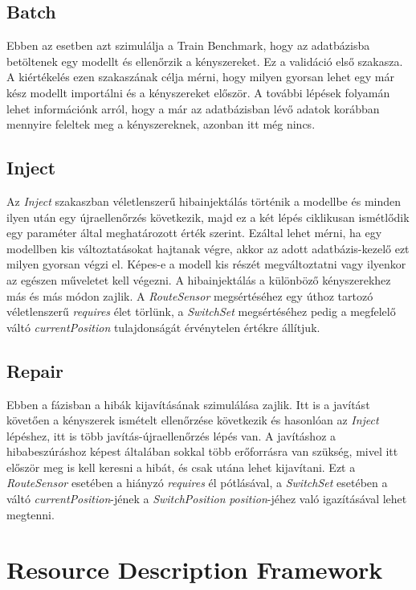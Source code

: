 \subsection{Batch}

Ebben az esetben azt szimulálja a Train Benchmark, hogy az adatbázisba betöltenek egy modellt és ellenőrzik a kényszereket. Ez a validáció első szakasza. A kiértékelés ezen szakaszának célja mérni, hogy milyen gyorsan lehet egy már kész modellt importálni és a kényszereket először. A további lépések folyamán lehet információnk arról, hogy a már az adatbázisban lévő adatok korábban mennyire feleltek meg a kényszereknek, azonban itt még nincs.

\subsection{Inject}

Az \emph{Inject} szakaszban véletlenszerű hibainjektálás történik a modellbe és minden ilyen után egy újraellenőrzés következik, majd ez a két lépés ciklikusan ismétlődik egy paraméter által meghatározott érték szerint. Ezáltal lehet mérni, ha egy modellben kis változtatásokat hajtanak végre, akkor az adott adatbázis-kezelő ezt milyen gyorsan végzi el. Képes-e a modell kis részét megváltoztatni vagy ilyenkor az egészen műveletet kell végezni. A hibainjektálás a különböző kényszerekhez más és más módon zajlik. A \emph{RouteSensor} megsértéséhez egy úthoz tartozó véletlenszerű \emph{requires} élet törlünk, a \emph{SwitchSet} megsértéséhez pedig a megfelelő váltó \emph{currentPosition} tulajdonságát érvénytelen értékre állítjuk.

\subsection{Repair}

Ebben a fázisban a hibák kijavításának szimulálása zajlik. Itt is a javítást követően a kényszerek ismételt ellenőrzése következik és hasonlóan az \emph{Inject} lépéshez, itt is több javítás-újraellenőrzés lépés van. A javításhoz a hibabeszúráshoz képest általában sokkal több erőforrásra van szükség, mivel itt először meg is kell keresni a hibát, és csak utána lehet kijavítani. Ezt a \emph{RouteSensor} esetében  a hiányzó \emph{requires} él pótlásával, a \emph{SwitchSet} esetében a váltó \emph{currentPosition}-jének a \emph{SwitchPosition} \emph{position}-jéhez való igazításával lehet megtenni.

\section{Resource Description Framework}

